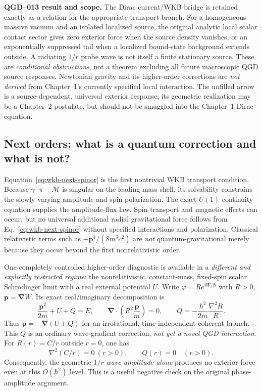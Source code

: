 \documentclass[11pt,a4paper]{article}
\begin{document}
\noindent\textbf{QGD--013 result and scope.} The Dirac current/WKB bridge is retained exactly as a relation for the appropriate transport branch. For a homogeneous massive vacuum and an isolated localized source, the original analytic local scalar contact sector gives zero exterior force when the source density vanishes, or an exponentially suppressed tail when a localized bound-state background extends outside. A radiating $1/r$ probe wave is not itself a finite stationary source. These are \emph{conditional obstructions}, not a theorem excluding all future macroscopic QGD source responses. Newtonian gravity and its higher-order corrections are \emph{not derived} from Chapter~1's currently specified local interaction. The unfilled arrow is a source-dependent, universal exterior response; its geometric realization may be a Chapter~2 postulate, but should not be smuggled into the Chapter~1 Dirac equation.

\subsection{Next orders: what is a quantum correction and what is not?}\label{sec:wkb-higher}
Equation~\eqref{eq:wkb-next-spinor} is the first nontrivial WKB transport condition.  Because $\gamma\cdot\pi-\mathcal M$ is singular on the leading mass shell, its solvability constrains the slowly varying amplitude and spin polarization.  The exact $U(1)$ continuity equation supplies the amplitude-flux law.  Spin transport and magnetic effects can occur, but no universal additional radial gravitational force follows from Eq.~\eqref{eq:wkb-next-spinor} without specified interactions and polarization.  Classical relativistic terms such as $-\bm p^4/(8m^3c^2)$ are \emph{not} quantum-gravitational merely because they occur beyond the first nonrelativistic order.

One completely controlled higher-order diagnostic is available in a \emph{different and explicitly restricted regime}: the nonrelativistic, constant-mass, fixed-spin scalar Schr\"odinger limit with a real external potential $U$.  Write $\varphi=R e^{iW/\hbar}$ with $R>0$, $\bm p=\bm\nabla W$.  Its exact real/imaginary decomposition is
\begin{equation}\label{eq:wkb-quantumHJ}
\frac{\bm p^2}{2m}+U+Q=E,\qquad
\bm\nabla\cdot\left(R^2\frac{\bm p}{m}\right)=0,\qquad
\boxed{Q=-\frac{\hbar^2}{2m}\frac{\nabla^2R}{R}.}
\end{equation}
Thus $\dot{\bm p}=-\bm\nabla(U+Q)$ for an irrotational, time-independent coherent branch.  This $Q$ is an ordinary wave-gradient correction, \emph{not yet a novel QGD interaction}.  For $R(r)=C/r$ outside $r=0$, one has
\begin{equation}\label{eq:wkb-no1overr}
\nabla^2(C/r)=0\ (r>0),\qquad \boxed{Q(r)=0\quad(r>0).}
\end{equation}
Consequently, the geometric $1/r$ \emph{wave amplitude alone} produces no exterior force even at this $O(\hbar^2)$ level.  This is a useful negative check on the original phase-amplitude argument.
\end{document}
